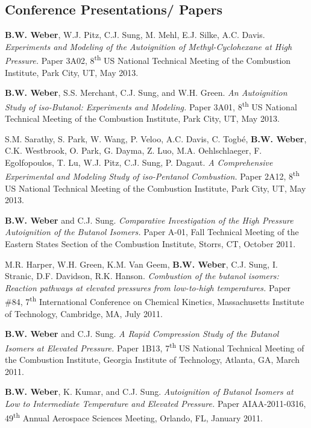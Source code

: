 \documentclass[margin,line]{res}
\newenvironment{list3}{
  \begin{list}{\ding{113}}{%
      \setlength{\itemsep}{0.1in}
      \setlength{\parsep}{0in} \setlength{\parskip}{0in}
      \setlength{\topsep}{0in} \setlength{\partopsep}{0in} 
      \setlength{\leftmargin}{0in}}}{\end{list}}
\begin{document}
\begin{resume}
\section{\sc Conference Presentations/ Papers}
\begin{list3}
\item[] {\bf B.W. Weber}, W.J. Pitz, C.J. Sung, M. Mehl, E.J. Silke, A.C. Davis. {\em Experiments and Modeling of the Autoignition of Methyl-Cyclohexane at High Pressure.} Paper 3A02, 8\textsuperscript{th} US National Technical Meeting of the Combustion Institute, Park City, UT, May 2013.
\item[] {\bf B.W. Weber}, S.S. Merchant, C.J. Sung, and W.H. Green. {\em An Autoignition Study of iso-Butanol: Experiments and Modeling.} Paper 3A01, 8\textsuperscript{th} US National Technical Meeting of the Combustion Institute, Park City, UT, May 2013.
\item[] S.M. Sarathy, S. Park, W. Wang, P. Veloo, A.C. Davis, C. Togb\'{e}, {\bf B.W. Weber}, C.K. Westbrook, O. Park, G. Dayma, Z. Luo, M.A. Oehlschlaeger, F. Egolfopoulos, T. Lu, W.J. Pitz, C.J. Sung, P. Dagaut. {\em A Comprehensive Experimental and Modeling Study of iso-Pentanol Combustion.} Paper 2A12, 8\textsuperscript{th} US National Technical Meeting of the Combustion Institute, Park City, UT, May 2013.
\item[] {\bf B.W. Weber} and C.J. Sung. {\em Comparative Investigation of the High Pressure Autoignition of the Butanol Isomers.} Paper A-01, Fall Technical Meeting of the Eastern States Section of the Combustion Institute, Storrs, CT, October 2011.
\item[] M.R. Harper, W.H. Green, K.M. Van Geem, {\bf B.W. Weber}, C.J. Sung, I. Stranic, D.F. Davidson,  R.K. Hanson. {\em Combustion of the butanol isomers: Reaction pathways at elevated pressures from low-to-high temperatures.} Paper \#84, 7\textsuperscript{th} International Conference on Chemical Kinetics, Massachusetts Institute of Technology, Cambridge, MA, July 2011.
\item[] {\bf B.W. Weber} and C.J. Sung. {\em A Rapid Compression Study of the Butanol Isomers at Elevated Pressure.} Paper 1B13, 7\textsuperscript{th} US National Technical Meeting of the Combustion Institute, Georgia Institute of Technology, Atlanta, GA, March 2011.
\item[] {\bf B.W. Weber}, K. Kumar, and C.J. Sung. {\em Autoignition of Butanol Isomers at Low to Intermediate Temperature and Elevated Pressure.} Paper AIAA-2011-0316, 49\textsuperscript{th} Annual Aerospace Sciences Meeting, Orlando, FL, January 2011.
\end{list3}


\end{resume}
\end{document}
